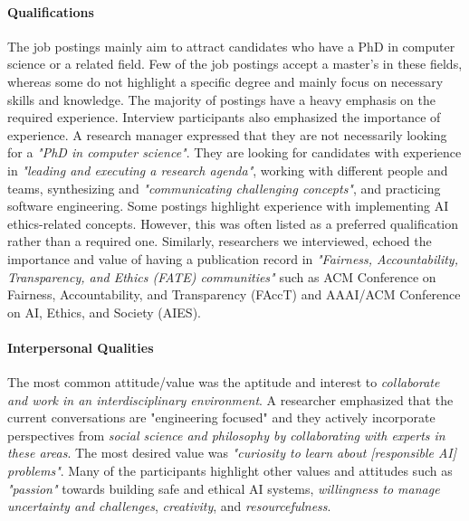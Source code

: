 \documentclass[sigconf]{acmart}
\begin{document}
\paragraph{Qualifications} 
The job postings mainly aim to attract candidates who have a PhD in computer science or a related field. Few of the job postings accept a master's in these fields, whereas some do not highlight a specific degree and mainly focus on necessary skills and knowledge. The majority of postings have a heavy emphasis on the required experience. Interview participants also emphasized the importance of experience. A research manager expressed that they are not necessarily looking for a \textit{"PhD in computer science"}. They are looking for candidates with experience in \textit{"leading and executing a research agenda"}, working with different people and teams, synthesizing and \textit{"communicating challenging concepts"}, and practicing software engineering. Some postings highlight experience with implementing \ac{AI} ethics-related concepts. However, this was often listed as a preferred qualification rather than a required one. Similarly, researchers we interviewed, echoed the importance and value of having a publication record in \textit{"Fairness, Accountability, Transparency, and Ethics (FATE) communities"} such as ACM Conference on Fairness, Accountability, and Transparency (FAccT) and AAAI/ACM Conference on AI, Ethics, and Society (AIES). %

\paragraph{Interpersonal Qualities}
The most common attitude/value was the aptitude and interest to \textit{collaborate and work in an interdisciplinary environment}. A researcher emphasized that the current conversations are "engineering focused" and they actively incorporate perspectives from\textit{ social science and philosophy by collaborating with experts in these areas}. The most desired value was \textit{"curiosity to learn about [responsible AI] problems"}. Many of the participants highlight other values and attitudes such as \textit{"passion"} towards building safe and ethical \ac{AI} systems, \textit{willingness to manage uncertainty and challenges}, \textit{creativity}, and \textit{resourcefulness}.
\end{document}
